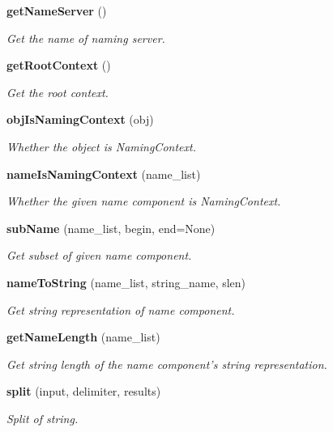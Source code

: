 \begin{CompactItemize}
{\bf get\-Name\-Server} ()
\begin{CompactList}\small\item\em Get the name of naming server. \item\end{CompactList}\item 
{\bf get\-Root\-Context} ()
\begin{CompactList}\small\item\em Get the root context. \item\end{CompactList}\item 
{\bf obj\-Is\-Naming\-Context} (obj)
\begin{CompactList}\small\item\em Whether the object is Naming\-Context. \item\end{CompactList}\item 
{\bf name\-Is\-Naming\-Context} (name\_\-list)
\begin{CompactList}\small\item\em Whether the given name component is Naming\-Context. \item\end{CompactList}\item 
{\bf sub\-Name} (name\_\-list, begin, end=None)
\begin{CompactList}\small\item\em Get subset of given name component. \item\end{CompactList}\item 
{\bf name\-To\-String} (name\_\-list, string\_\-name, slen)
\begin{CompactList}\small\item\em Get string representation of name component. \item\end{CompactList}\item 
{\bf get\-Name\-Length} (name\_\-list)
\begin{CompactList}\small\item\em Get string length of the name component's string representation. \item\end{CompactList}\item 
{\bf split} (input, delimiter, results)
\begin{CompactList}\small\item\em Split of string. \item\end{CompactList}\end{CompactItemize}


